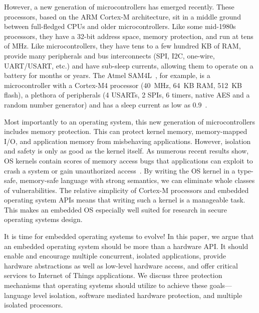 However, a new generation of microcontrollers has emerged recently.
These processors, based on the ARM Cortex-M architecture, sit in a middle ground
between full-fledged CPUs and older microcontrollers. Like some mid-1980s processors,
they have a 32-bit address space, memory protection, and run at tens of MHz.
Like microcontrollers, they have tens to a few hundred KB of RAM, provide many
peripherals and bus interconnects (SPI, I2C, one-wire, UART/USART, etc.) and
have sub-\uA sleep currents, allowing them to operate on a battery for
months or years. The Atmel SAM4L~\cite{sam4l}, for example, is a
microcontroller with a Cortex-M4 processor (40~MHz, 64~KB RAM, 512~KB flash), a
plethora of peripherals (4 USARTs, 2 SPIs, 6 timers, native AES and a random number
generator) and has a sleep current as low as $0.9$~\uA.

Most importantly to an operating system, this new generation of microcontrollers includes
memory protection.
This can protect kernel memory, memory-mapped I/O, and
application memory from misbehaving applications. However,
isolation and safety is only as good as the kernel itself. As numerous recent
results show, OS kernels contain scores of memory access bugs that applications
can exploit to crash a system or gain unauthorized
access~\cite{kint:osdi2012,linuxvulns:apsys11}. By writing the OS kernel in a
type-safe, memory-safe language with strong semantics, we can eliminate whole
classes of vulnerabilities. The relative simplicity of Cortex-M processors and
embedded operating system APIs means that writing such a kernel is a
manageable task.  This makes an embedded OS especially well suited for
research in secure operating systems design.

It is time for embedded operating systems to evolve! In this paper, we argue
that an embedded operating system should be more than a hardware API.
It should enable and encourage
multiple concurrent, isolated applications, provide  hardware abstractions
as well as low-level hardware access, and offer critical services to Internet
of Things applications. We discuss three protection
mechanisms that operating systems should utilize to achieve these goals---language level isolation, software mediated hardware protection, and
multiple isolated processors.


%
